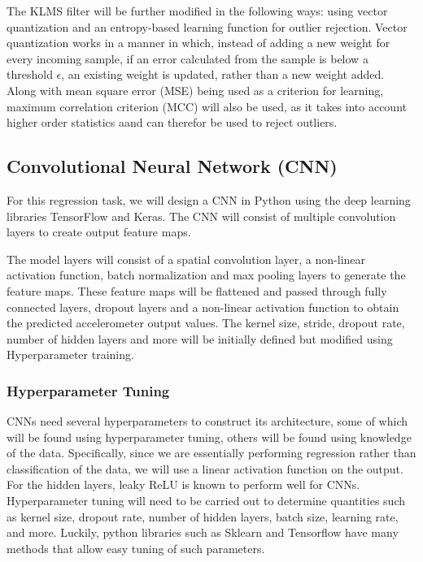 \documentclass[12pt]{article}
\begin{document}
The KLMS filter will be further modified in the following ways: using vector quantization and an entropy-based learning function for outlier rejection. Vector quantization works in a manner in which, instead of adding a new weight for every incoming sample, if an error calculated from the sample is below a threshold $\epsilon$, an existing weight is updated, rather than a new weight added. Along with mean square error (MSE) being used as a criterion for learning, maximum correlation criterion (MCC) will also be used, as it takes into account higher order statistics aand can therefor be used to reject outliers.

\subsection{Convolutional Neural Network (CNN)}

For this regression task, we will design a CNN in Python using the deep learning libraries TensorFlow and Keras. The CNN will consist of multiple convolution layers to create output feature maps. \cite{Angrick2019}

The model layers will consist of a spatial convolution layer, a non-linear activation function, batch normalization and max pooling layers to generate the feature maps. These feature maps will be flattened and passed through fully connected layers, dropout layers and a non-linear activation function to obtain the predicted accelerometer output values. The kernel size, stride, dropout rate, number of hidden layers and more will be initially defined but modified using Hyperparameter training.

\subsubsection{Hyperparameter Tuning}

CNNs need several hyperparameters to construct its architecture, some of which will be found using hyperparameter tuning, others will be found using knowledge of the data. Specifically, since we are essentially performing regression rather than classification of the data, we will use a linear activation function on the output. For the hidden layers, leaky ReLU is known to perform well for CNNs. Hyperparameter tuning will need to be carried out to determine quantities such as kernel size, dropout rate, number of hidden layers, batch size, learning rate, and more. Luckily, python libraries such as Sklearn and Tensorflow have many methods that allow easy tuning of such parameters.
\end{document}
